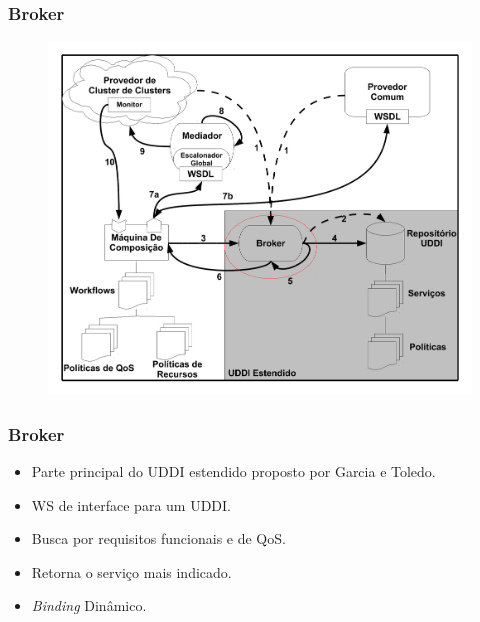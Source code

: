 \documentclass[red, cover=invisible, theme=Warsaw]{myslides}
\begin{document}
	\begin{frame} \frametitle{Broker}
	    \begin{center}
		\begin{figure}
		\includegraphics[scale=0.25]{imagens/execComposicaoA-2.pdf}	    
		\end{figure}
	    \end{center}
	\end{frame}

	\begin{frame} \frametitle{Broker}
	    \begin{itemize}
		\item Parte principal do UDDI estendido proposto por Garcia e Toledo.
		\item WS de interface para um UDDI.
		\item Busca por requisitos funcionais e de QoS.
		\item Retorna o serviço mais indicado.
		\item \textit{Binding} Dinâmico.
	    \end{itemize}				
	\end{frame}
\end{document}
